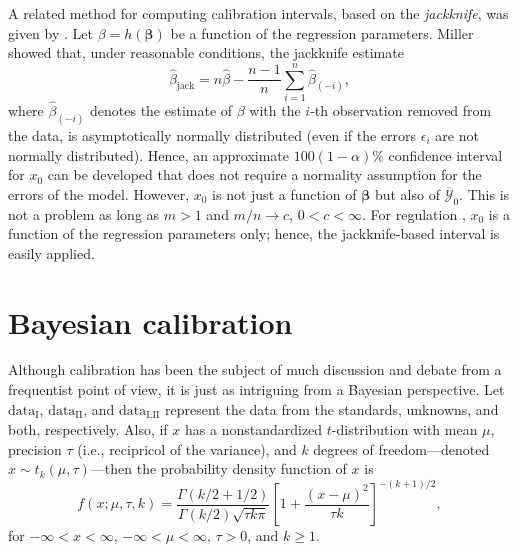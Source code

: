 \documentclass[cmfont,usenames,dvipsnames,leqno]{afit-etd}\usepackage[]{graphicx}\usepackage[]{color}
\newcommand{\mc}[1]{\ensuremath{\mathcal{#1}}}
\newcommand{\wh}[1]{\ensuremath{\widehat{#1}}}
\newcommand{\wb}[1]{\ensuremath{\overline{#1}}}
\begin{document}
A related method for computing calibration intervals, based on the \textit{jackknife}, was given by \citet{miller_unbalanced_1974}. Let $\beta = h(\bm{\beta})$ be a function of the regression parameters. Miller showed that, under reasonable conditions, the jackknife estimate
\begin{equation*}
  \wh{\beta}_\text{jack} = n\wh{\beta} - \frac{n-1}{n}\sum_{i=1}^n\wh{\beta}_{(-i)},
\end{equation*}
where $\wh{\beta}_{(-i)}$ denotes the estimate of $\beta$ with the $i$-th observation removed from the data, is asymptotically normally distributed (even if the errors $\epsilon_i$ are not normally distributed). Hence, an approximate $100(1-\alpha)\%$ confidence interval for $x_0$ can be developed that does not require a normality assumption for the errors of the model. However, $x_0$ is not just a function of $\bm{\beta}$ but also of $\wb{\mc{Y}}_0$. This is not a problem as long as $m > 1$ and $m/n \rightarrow c$, $0 < c < \infty$. For regulation \citep[pp. 431-432]{graybill_regression_1994}, $x_0$ is a function of the regression parameters only; hence, the jackknife-based interval is easily applied.

\section{Bayesian calibration}
\label{sec:bayesian}
Although calibration has been the subject of much discussion and debate from a frequentist point of view, it is just as intriguing from a Bayesian perspective. Let $\text{data}_\text{I}$, $\text{data}_\text{II}$, and $\text{data}_{\text{I}, \text{II}}$ represent the data from the standards, unknowns, and both, respectively. Also, if $x$ has a nonstandardized $t$-distribution with mean $\mu$, precision $\tau$ (i.e., recipricol of the variance), and $k$ degrees of freedom---denoted $x \sim t_k(\mu, \tau)$---then the probability density function of $x$ is
\begin{equation*}
  f(x;\mu, \tau, k) = \frac{\Gamma{(k/2+1/2)}}{\Gamma{(k/2)}\sqrt{\tau k \pi}}\left[ 1 + \frac{(x-\mu)^2}{\tau k} \right]^{-(k+1)/2},
\end{equation*}
for $-\infty < x < \infty$, $-\infty < \mu < \infty$, $\tau > 0$, and $k \ge 1$.
\end{document}
